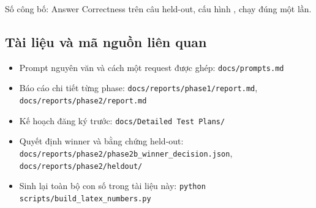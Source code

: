 Số công bố: Answer Correctness \textbf{\NumHoAC{}} trên \NumNHeldout{} câu
held-out, cấu hình \NumWinner{}, chạy đúng một lần.

\subsection*{Tài liệu và mã nguồn liên quan}

\begin{itemize}\small
  \item Prompt nguyên văn và cách một request được ghép: \texttt{docs/prompts.md}
  \item Báo cáo chi tiết từng phase: \texttt{docs/reports/phase1/report.md},
        \texttt{docs/reports/phase2/report.md}
  \item Kế hoạch đăng ký trước: \texttt{docs/Detailed Test Plans/}
  \item Quyết định winner và bằng chứng held-out:
        \texttt{docs/reports/phase2/phase2b\_winner\_decision.json},
        \texttt{docs/reports/phase2/heldout/}
  \item Sinh lại toàn bộ con số trong tài liệu này:
        \texttt{python scripts/build\_latex\_numbers.py}
\end{itemize}

